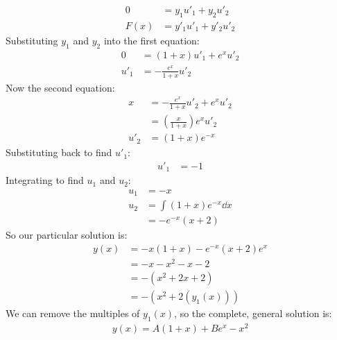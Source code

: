 \documentclass{article}
\begin{document}
\begin{equation*}
\begin{aligned}
	0 &= y_1u'_1 + y_2u'_2 \\
	F(x) &= y'_1u'_1 + y'_2u'_2
\end{aligned}
\end{equation*}
Substituting $y_1$ and $y_2$ into the first equation:
\begin{equation*}
\begin{aligned}
	0 &= (1+x)u'_1 + e^x u'_2 \\
	u'_1 &= -\frac{e^x}{1+x}u'_2
\end{aligned}
\end{equation*}
Now the second equation:
\begin{equation*}
\begin{aligned}
	x &= -\frac{e^x}{1+x}u'_2 + e^x u'_2 \\
		&= \left(\frac{x}{1+x}\right)e^x u'_2 \\
	u'_2 &= (1+x)e^{-x}
\end{aligned}
\end{equation*}
Substituting back to find $u'_1$:
\begin{equation*}
\begin{aligned}
	u'_1 &= -1
\end{aligned}
\end{equation*}
Integrating to find $u_1$ and $u_2$:
\begin{equation*}
\begin{aligned}
	u_1 &= -x \\
	u_2 &= \int (1+x)e^{-x} \dd x \\
		&= -e^{-x}\left(x+2\right)
\end{aligned}
\end{equation*}
So our particular solution is:
\begin{equation*}
\begin{aligned}
	y(x) &= -x (1+x) -e^{-x}\left(x+2\right)e^x \\
		&= -x - x^2 - x - 2 \\
		&= -(x^2 + 2x + 2) \\
		&= -(x^2 + 2(y_1(x)))
\end{aligned}
\end{equation*}
We can remove the multiples of $y_1(x)$, so the complete, general solution is:
\begin{equation*}
\begin{aligned}
	\boxed{y(x) = A(1+x) + Be^x - x^2}
\end{aligned}
\end{equation*}
\end{document}
